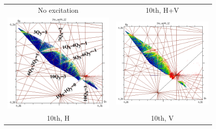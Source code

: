 \documentclass[
prstab
,reprint
,linenumbers
,longbibliography
,preprintnumbers
,showkeys
,amsfonts,amssymb,amsmath
,floatfix
]{revtex4-1}
\newlength{\fmawidth}
\newlength{\smallfmawidth}
\begin{document}
\begin{figure}
  \begin{tabular}{cc}
    No excitation & 10th, H+V \\
    \includegraphics[width=\smallfmawidth]{2016injnocolc15o+19_6noerru_dp0_ord10_annotate.png} &
    \includegraphics[width=\smallfmawidth]{2016injnocolc15o+19_6noerrut10skhv_dp0_ord10.png} \\
    10th, H & 10th, V \\

\end{tabular}
\end{figure}
\end{document}
